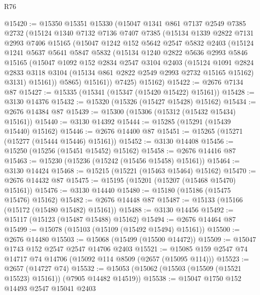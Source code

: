 \begin{lexlean}{R76}
\begin{coremodule}
@15420 := @15350
    @15351
    @15330
    (@15047
      @1341
      @861
      @7137
      @2549
      @7385
      @2732
      (@15124
        @1340
        @7132
        @7136
        @7407
        @7385
        (@15134
          @1339
          @2822
          @7131
          @2993
          @7406
          @15165
          (@15047
            @1242
            @152
            @5642
            @2547
            @5832
            @2403
            (@15124
              @1241
              @5637
              @5641
              @5847
              @5832
              (@15134
                @1240
                @2822
                @5636
                @2993
                @5846
                @15165
                (@15047
                  @1092
                  @152
                  @2834
                  @2547
                  @3104
                  @2403
                  (@15124
                    @1091
                    @2824
                    @2833
                    @3118
                    @3104
                    (@15134 @861 @2822 @2549 @2993 @2732 @15165 @15162)
                    @3131)
                  @15161))
              @5865)
            @15161))
        @7425)
      @15162)
@15422 := @2676 @7134 @87
@15427 := @15335 (@15341 (@15347 (@15420 @15422) @15161))
@15428 := @3130 @14376
@15432 := @15320 (@15326 (@15427 @15428) @15162)
@15434 := @2676 @14384 @87
@15439 := @15300 (@15306 (@15312 (@15432 @15434) @15161))
@15440 := @3130 @14392
@15444 := @15285 (@15291 (@15439 @15440) @15162)
@15446 := @2676 @14400 @87
@15451 := @15265 (@15271 (@15277 (@15444 @15446) @15161))
@15452 := @3130 @14408
@15456 := @15250 (@15256 (@15451 @15452) @15162)
@15458 := @2676 @14416 @87
@15463 := @15230 (@15236 (@15242 (@15456 @15458) @15161))
@15464 := @3130 @14424
@15468 := @15215 (@15221 (@15463 @15464) @15162)
@15470 := @2676 @14432 @87
@15475 := @15195 (@15201 (@15207 (@15468 @15470) @15161))
@15476 := @3130 @14440
@15480 := @15180 (@15186 (@15475 @15476) @15162)
@15482 := @2676 @14448 @87
@15487 := @15133 (@15166 (@15172 (@15480 @15482) @15161))
@15488 := @3130 @14456
@15492 := @15117 (@15123 (@15487 @15488) @15162)
@15494 := @2676 @14464 @87
@15499 := @15078 (@15103 (@15109 (@15492 @15494) @15161))
@15500 := @2676 @14480
@15503 := @15068 (@15499 (@15500 @14472))
@15509 := @15047 @1743 @152 @2547 @2547 @14706 @2403
@15521 := @15085 @159 @2547 @74 @14717 @74 @14706 (@15092 @114 @8509 (@2657 (@15095 @114)))
@15523 := @2657 (@14727 @74)
@15532 := @15053 (@15062 (@15503 (@15509 (@15521 @15523) @15161)) (@7905 @14482 @14519))
@15538 := @15047 @1750 @152 @14493 @2547 @15041 @2403

\end{coremodule}
\end{lexlean}

